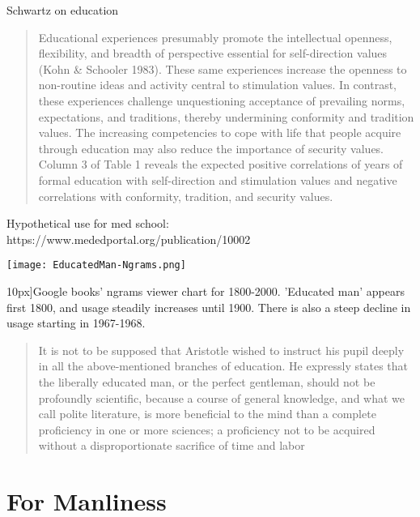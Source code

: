 Schwartz on education

\begin{quote}

Educational experiences presumably promote the intellectual openness, flexibility, and breadth of perspective essential for self-direction values (Kohn \& Schooler 1983). These same experiences increase the openness to non-routine ideas and activity central to stimulation values. In contrast, these experiences challenge unquestioning acceptance of prevailing norms, expectations, and traditions, thereby undermining conformity and tradition values. The increasing competencies to cope with life that people acquire through education may also reduce the importance of security values. Column 3 of Table 1 reveals the expected positive correlations of years of formal education with self-direction and stimulation values and negative correlations with conformity, tradition, and security values. ~\citep{Schwartz:2005ue}
\end{quote}

Hypothetical use for med school: https:\slash \slash www.mededportal.org\slash publication\slash 10002

\begin{figure*}\texttt{[image: EducatedMan-Ngrams.png]}\caption[Google Ngrams data for 'educated man' versus 'educated woman'][10px]{Google books' ngrams viewer chart for 1800-2000. 'Educated man' appears first 1800, and usage steadily increases until 1900. There is also a steep decline in usage starting in 1967-1968.}\label{fig:highereducation}\end{figure*}

\begin{quote}

It is not to be supposed that Aristotle wished to instruct his pupil deeply in all the above-mentioned branches of education. He expressly states that the liberally educated man, or the perfect gentleman, should not be profoundly scientific, because a course of general knowledge, and what we call polite literature, is more beneficial to the mind than a complete proficiency in one or more sciences; a proficiency not to be acquired without a disproportionate sacrifice of time and labor ~\citep[p. 15]{Williams:1829vf} 
\end{quote}

\section{For Manliness}
\label{formanliness}

